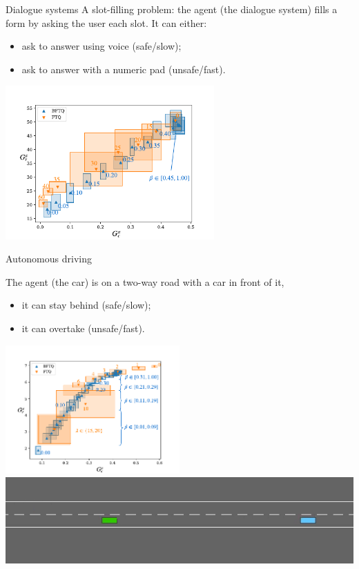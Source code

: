 \documentclass[slideopt,A4,showboxes,svgnames]{beamer}
\begin{document}
\begin{frame}{Dialogue systems}
A slot-filling problem: the agent (the dialogue system) fills a form by asking the user each slot. It can either:
\begin{itemize}
	\item ask to answer using {\green voice} {\green (safe/slow)};
	\item ask to answer with a {\red numeric pad} {\red (unsafe/fast)}.
\end{itemize}


\begin{center}
	\includegraphics[trim={0 0.1cm 0 0.8cm}, clip, width=0.6\textwidth]{../../source/img/slot-filling.pdf}
\end{center}
\end{frame}


\begin{frame}{Autonomous driving}

The agent (the car) is on a two-way road with a car in front of it,
\begin{itemize}
	\item it can {\green stay behind} {\green (safe/slow)};
	\item it can {\red overtake} {\red (unsafe/fast)}.
	\end{itemize}

\begin{center}
\includegraphics[trim={0 0cm 0 0.8cm}, clip, width=0.5\textwidth]{../../source/img/highway.pdf}\\
\href{https://budgeted-rl.github.io/\#driving-styles}{\includegraphics[width=0.5\linewidth]{img/highway_env}}
\end{center}
\end{frame}
\end{document}
